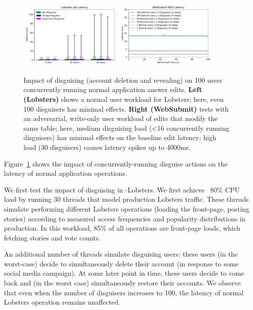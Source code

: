 \begin{figure}[t!]
    \centering
        \includegraphics[width=0.45\textwidth]{figs/lobsters_concurrent_results}
        \includegraphics[width=0.45\textwidth]{figs/websubmit_concurrent_results_timeseries}
    \caption{Impact of disguising (account deletion and revealing) on 100 users concurrently running
    normal application answer edits.
    \textbf{Left (Lobsters)} shows a normal user workload for Lobsters; here, even 100 disguisers
    has minimal effects.
    \textbf{Right (WebSubmit)} tests with an adversarial,
    write-only user workload of edits that modify the same table; here, medium disguising load (<16
    concurrently running disguisers) has minimal effects on the baseline edit latency; high load (30
    disguisers) causes latency spikes up to 4000ms.
    }
    \label{fig:concurrent}
\end{figure}

Figure~\ref{fig:concurrent} shows the impact of concurrently-running disguise actions on the latency
of normal application operations.

We first test the impact of disguising in \sys-Lobsters. We first achieve ~80\% CPU load by running
30 threads that model production Lobsters traffic. These threads simulate performing different
Lobsters operations (\eg loading the front-page, posting stories) according to measured access
frequencies and popularity distributions in production. In this workload, 85\% of all
operations are front-page loads, which fetching stories and vote counts.

An additional number of threads simulate disguising users: these users (in the worst-case) decide to
simultaneously delete their account (\eg in response to some social media campaign). At some later
point in time, these users decide to come back and (in the worst case) simultaneously restore their
accounts.
We observe that even when the number of disguisers increases to 100, the latency of normal Lobsters
operation remains unaffected.

